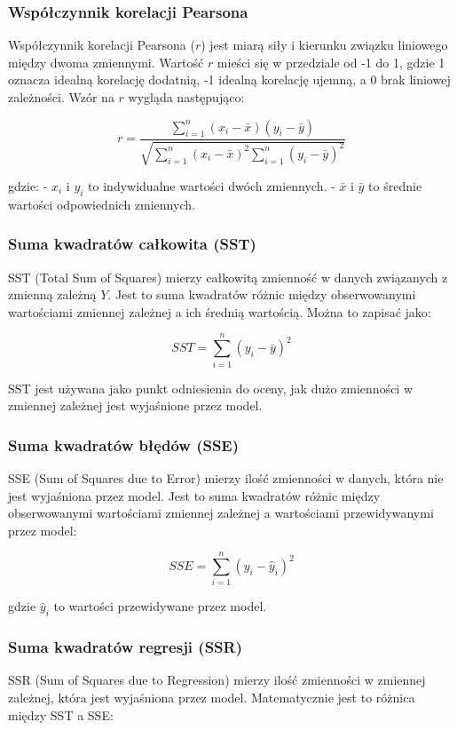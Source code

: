 \documentclass{article}
\begin{document}
\subsubsection{Współczynnik korelacji Pearsona}
Współczynnik korelacji Pearsona (\(r\)) jest miarą siły i kierunku związku liniowego między dwoma zmiennymi. Wartość \(r\) mieści się w przedziale od -1 do 1, gdzie 1 oznacza idealną korelację dodatnią, -1 idealną korelację ujemną, a 0 brak liniowej zależności. Wzór na \(r\) wygląda następująco:

\[ r = \frac{\sum_{i=1}^{n} (x_i - \bar{x})(y_i - \bar{y})}{\sqrt{\sum_{i=1}^{n}(x_i - \bar{x})^2 \sum_{i=1}^{n}(y_i - \bar{y})^2}} \]

gdzie:
- \(x_i\) i \(y_i\) to indywidualne wartości dwóch zmiennych.
- \(\bar{x}\) i \(\bar{y}\) to średnie wartości odpowiednich zmiennych.

\subsubsection{Suma kwadratów całkowita (SST)}
SST (Total Sum of Squares) mierzy całkowitą zmienność w danych związanych z zmienną zależną \(Y\). Jest to suma kwadratów różnic między obserwowanymi wartościami zmiennej zależnej a ich średnią wartością. Można to zapisać jako:

\[ SST = \sum_{i=1}^{n} (y_i - \bar{y})^2 \]

SST jest używana jako punkt odniesienia do oceny, jak dużo zmienności w zmiennej zależnej jest wyjaśnione przez model.

\subsubsection{Suma kwadratów błędów (SSE)}
SSE (Sum of Squares due to Error) mierzy ilość zmienności w danych, która nie jest wyjaśniona przez model. Jest to suma kwadratów różnic między obserwowanymi wartościami zmiennej zależnej a wartościami przewidywanymi przez model:

\[ SSE = \sum_{i=1}^{n} (y_i - \hat{y}_i)^2 \]

gdzie \(\hat{y}_i\) to wartości przewidywane przez model.

\subsubsection{Suma kwadratów regresji (SSR)}
SSR (Sum of Squares due to Regression) mierzy ilość zmienności w zmiennej zależnej, która jest wyjaśniona przez model. Matematycznie jest to różnica między SST a SSE:
\end{document}
